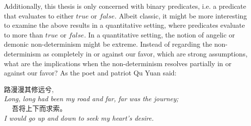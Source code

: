 Additionally, this thesis is only concerned with binary predicates, i.e. a predicate that evaluates to either $true$ or $false$. 
Albeit classic, it might be more interesting to examine the above results in a quantitative setting, where predicates evaluate to more than $true$ or $false$. 
In a quantitative setting, the notion of angelic or demonic non-determinism might be extreme. 
Instead of regarding the non-determinism as completely in or against our favor, which are strong assumptions, what are the implications when the non-determinism resolves partially in or against our favor? 
As the poet and patriot Qu Yuan said: 
\begin{center}
    路漫漫其修远兮,\\
    \textit{Long, long had been my road and far, far was the journey;} \\ 
    \ \ \,吾将上下而求索。\\
    \textit{I would go up and down to seek my heart’s desire.}~\cite{hawkes2012}
\end{center}




